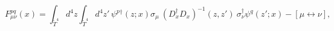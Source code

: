 \begin{equation}\label{t4strength}
F_{\mu\nu}^{pq}(x)=\int_{\tilde T^4}d^4z
\int_{\tilde T^4} d^4z'\, 
\psi^p{}^\dagger(z;x)\sigma_\mu~(D_x^\dagger D_x)^{-1}(z,z')~\sigma_\nu^\dagger
\psi^q(z';x)-[\mu\leftrightarrow\nu],\end{equation}


